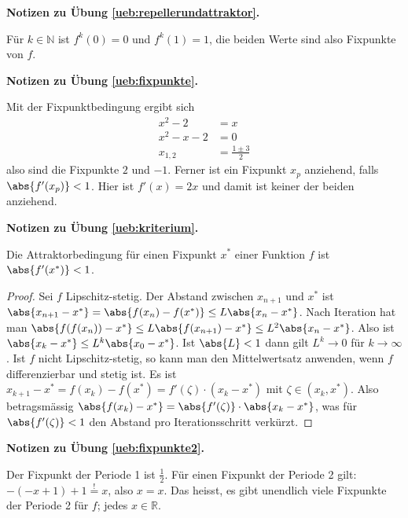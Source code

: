 \documentclass[%
11pt,%
twoside,%
titlepage,%
german,%
headsepline%
]{scrartcl}
\newcommand{\concatueb}[1]{ueb:#1}%
\newcommand{\concatlsg}[1]{lsg:#1}%
\newenvironment{lsg}[1]{%
    \par\noindent\textbf{Notizen zu Übung \ref{\concatueb{#1}}.}%
    \label{\concatlsg{#1}}
}{%
    \par%
}
\begin{document}
\begin{lsg}{repellerundattraktor}
Für $k\in\mathbb{N}$ ist $f^{k}(0)=0$ und $f^{k}(1)=1$, die beiden Werte sind also Fixpunkte von $f$.
\end{lsg}
\begin{lsg}{fixpunkte}
Mit der Fixpunktbedingung ergibt sich
\begin{align*}
x^2-2 &= x\\
x^2-x-2 &= 0\\
x_{1,2} &= \frac{1\pm3}{2}
\end{align*}
also sind die Fixpunkte $2$ und $-1$. Ferner ist ein Fixpunkt $x_p$ anziehend, falls $\abs{f'(x_p)}<1$. Hier ist $f'(x)=2x$ und damit ist keiner der beiden anziehend.
\end{lsg}
\begin{lsg}{kriterium}
Die Attraktorbedingung für einen Fixpunkt $x^*$ einer Funktion $f$ ist $\abs{f'(x^*)}<1$.
\begin{proof}
Sei $f$ Lipschitz-stetig. Der Abstand zwischen $x_{n+1}$ und $x^*$ ist $\abs{x_{n+1}-x^*}=\abs{f(x_n)-f(x^*)}\leq L\abs{x_n-x^*}$. Nach Iteration hat man $\abs{f(f(x_n))-x^*}\leq L\abs{f(x_{n+1})-x^*}\leq L^2\abs{x_n-x^*}$. Also ist $\abs{x_k-x^*}\leq L^k\abs{x_0-x^*}$. Ist $\abs{L}<1$ dann gilt $L^k\to0$ für $k\to\infty$. Ist $f$ nicht Lipschitz-stetig, so kann man den Mittelwertsatz anwenden, wenn $f$ differenzierbar und stetig ist. Es ist $x_{k+1}-x^*=f(x_k)-f(x^*)=f'(\zeta)\cdot(x_k-x^*)$ mit $\zeta\in(x_k,x^*)$. Also betragsmässig $\abs{f(x_k)-x^*} = \abs{f'(\zeta)}\cdot\abs{x_k-x^*}$, was für $\abs{f'(\zeta)}<1$ den Abstand pro Iterationsschritt verkürzt.
\end{proof}
\end{lsg}
\begin{lsg}	{fixpunkte2}
Der Fixpunkt der Periode 1 ist $\frac{1}{2}$. Für einen Fixpunkt der Periode 2 gilt: $-(-x+1)+1\stackrel{!}{=}x$, also $x=x$. Das heisst, es gibt unendlich viele Fixpunkte der Periode 2 für $f$; jedes $x\in\mathbb{R}$.
\end{lsg}
\end{document}
